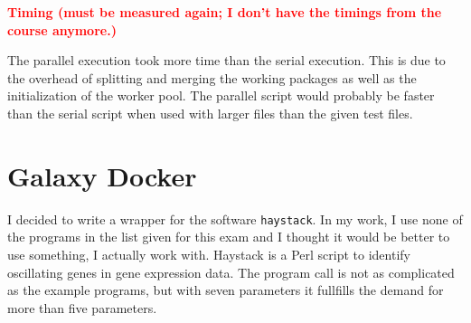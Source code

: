 \documentclass[paper=a4, 12pt]{scrartcl}
\newcommand{\xxx}[1]{\textbf{\textcolor{red}{#1}}}	%
\begin{document}
\xxx{Timing (must be measured again; I don't have the timings from the course anymore.)}

The parallel execution took more time than the serial execution. This is due to the overhead of splitting and merging the working packages as well as the initialization of the worker pool. The parallel script would probably be faster than the serial script when used with larger files than the given test files.

\section{Galaxy Docker}

I decided to write a wrapper for the software \texttt{haystack}. In my work, I use none of the programs in the list given for this exam and I thought it would be better to use something, I actually work with. Haystack is a Perl script to identify oscillating genes in gene expression data. The program call is not as complicated as the example programs, but with seven parameters it fullfills the demand for more than five parameters.
\end{document}

